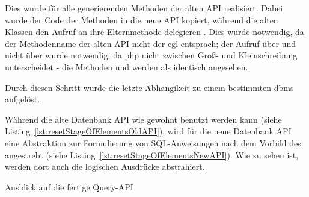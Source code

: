 Dies wurde für alle generierenden Methoden der alten API realisiert. Dabei wurde der Code der Methoden in die neue API kopiert, während die alten Klassen den Aufruf an ihre Elternmethode delegieren . Dies wurde notwendig, da der Methodenname der alten API nicht der \gls{cgl} entsprach; der Aufruf über  und nicht über  wurde notwendig, da \gls{php} nicht zwischen Groß- und Kleinschreibung unterscheidet - die Methoden  und  werden als identisch angesehen. 

Durch diesen Schritt wurde die letzte Abhängikeit zu einem bestimmten \gls{dbms} aufgelöst.

Während die alte Datenbank API wie gewohnt benutzt werden kann (siehe Listing~\ref{lst:resetStageOfElementsOldAPI}), wird für die neue Datenbank API eine Abstraktion zur Formulierung von SQL-Anweisungen nach dem Vorbild des  angestrebt (siehe Listing~\ref{lst:resetStageOfElementsNewAPI}). Wie zu sehen ist, werden dort auch die logischen Ausdrücke abstrahiert.

\begin{listing}[H]
\caption{}
\label{lst:resetStageOfElementsOldAPI}
\end{listing}

\begin{listing}[H]
\caption{Ausblick auf die fertige Query-API}
\label{lst:resetStageOfElementsNewAPI}
\end{listing}

